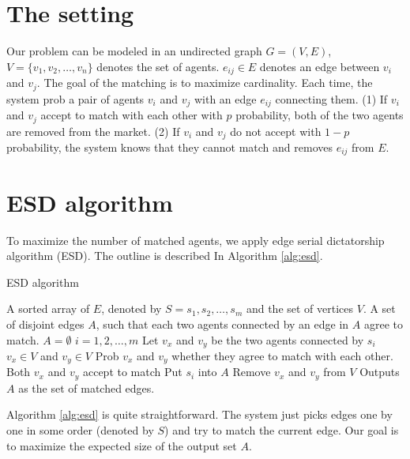 \documentclass[letterpaper]{article}
\begin{document}
\section{The setting}

Our problem can be modeled in an undirected graph $G=(V,E)$, $V=\{v_1,v_2,\ldots,v_n\}$ denotes the set of agents. $e_{ij}\in E$ denotes an edge between $v_i$ and $v_j$.
The goal of the matching is to maximize cardinality. Each time, the system prob a pair of agents $v_i$ and $v_j$ with an edge $e_{ij}$ connecting them. 
(1) If $v_i$ and $v_j$ accept to match with each other with $p$ probability, both of the two agents are removed from the market.
(2) If $v_i$ and $v_j$ do not accept with $1-p$ probability, the system knows that they cannot match and removes $e_{ij}$ from $E$.

\section{ESD algorithm}

To maximize the number of matched agents, we apply edge serial dictatorship algorithm (ESD).
The outline is described In Algorithm \ref{alg:esd}.

\begin{algorithm}
	\caption{ESD algorithm}
	\label{alg:esd}
	\begin{algorithmic}[1]
		\Require
		A sorted array of $E$, denoted by $S=s_1,s_2,\ldots,s_m$ and the set of vertices $V$.
		\Ensure A set of disjoint edges $A$, such that each two agents connected by an edge in $A$ agree to match. 
		\State $A=\emptyset$
		\For $i=1,2,\ldots,m$
		\State Let $v_x$ and $v_y$ be the two agents connected by $s_i$
		\If $v_x\in V$ and $v_y\in V$
		\State Prob $v_x$ and $v_y$ whether they agree to match with each other.
		\If Both $v_x$ and $v_y$ accept to match
		\State Put $s_i$ into $A$
		\State Remove $v_x$ and $v_y$ from $V$
		\EndIf
		\EndIf
		\EndFor
		\State Outputs $A$ as the set of matched edges.
	\end{algorithmic}
\end{algorithm}

Algorithm \ref{alg:esd} is quite straightforward. The system just picks edges one by one in some order (denoted by $S$) and try to match the current edge. Our goal is to maximize the expected size of the output set $A$.
\end{document}
